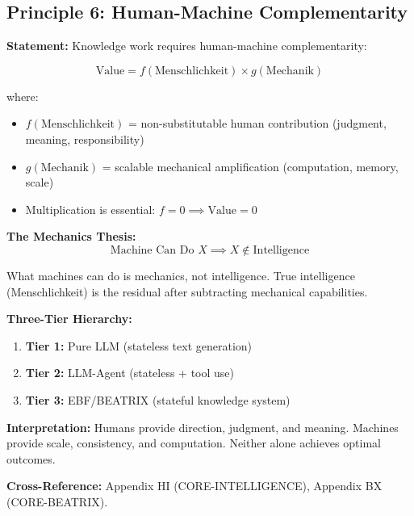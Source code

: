 \subsection{Principle 6: Human-Machine Complementarity}

\begin{tcolorbox}[colback=gray!5!white, colframe=gray!75!black,
    title=Axiom PR-6: The Autor-Fehr Synthesis]

\textbf{Statement:} Knowledge work requires human-machine complementarity:

\begin{equation}
\boxed{\text{Value} = f(\text{Menschlichkeit}) \times g(\text{Mechanik})}
\label{eq:pr-autor-fehr}
\end{equation}

where:
\begin{itemize}[nosep]
    \item $f(\text{Menschlichkeit})$ = non-substitutable human contribution (judgment, meaning, responsibility)
    \item $g(\text{Mechanik})$ = scalable mechanical amplification (computation, memory, scale)
    \item Multiplication is essential: $f = 0 \implies \text{Value} = 0$
\end{itemize}

\textbf{The Mechanics Thesis:}
\begin{equation}
\text{Machine Can Do } X \implies X \notin \text{Intelligence}
\end{equation}

What machines can do is mechanics, not intelligence. True intelligence (Menschlichkeit) is the residual after subtracting mechanical capabilities.

\textbf{Three-Tier Hierarchy:}
\begin{enumerate}
    \item \textbf{Tier 1:} Pure LLM (stateless text generation)
    \item \textbf{Tier 2:} LLM-Agent (stateless + tool use)
    \item \textbf{Tier 3:} EBF/BEATRIX (stateful knowledge system)
\end{enumerate}

\textbf{Interpretation:} Humans provide direction, judgment, and meaning. Machines provide scale, consistency, and computation. Neither alone achieves optimal outcomes.

\textbf{Cross-Reference:} Appendix HI (CORE-INTELLIGENCE), Appendix BX (CORE-BEATRIX).

\end{tcolorbox}


